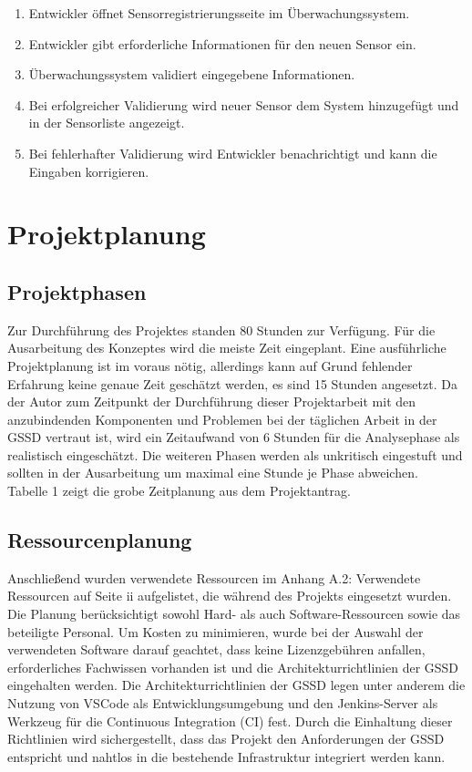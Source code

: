 \begin{flushleft}
\begin{itemize}
\begin{itemize}
		\begin{enumerate}
			\item Entwickler öffnet Sensorregistrierungsseite im Überwachungssystem.
			\item Entwickler gibt erforderliche Informationen für den neuen Sensor ein.
			\item Überwachungssystem validiert eingegebene Informationen.
			\item Bei erfolgreicher Validierung wird neuer Sensor dem System hinzugefügt und in der Sensorliste angezeigt.
			\item Bei fehlerhafter Validierung wird Entwickler benachrichtigt und kann die Eingaben korrigieren.
		\end{enumerate}
	\end{itemize}
\end{itemize}

\section{Projektplanung}

\subsection{Projektphasen}
Zur Durchführung des Projektes standen 80 Stunden zur Verfügung. Für die Ausarbeitung des Konzeptes
wird die meiste Zeit eingeplant. Eine ausführliche Projektplanung ist im voraus nötig, allerdings kann auf
Grund fehlender Erfahrung keine genaue Zeit geschätzt werden, es sind 15 Stunden angesetzt. Da der
Autor zum Zeitpunkt der Durchführung dieser Projektarbeit mit den anzubindenden Komponenten und
Problemen bei der täglichen Arbeit in der \acs{GSSD} vertraut ist, wird ein Zeitaufwand von 6 Stunden für die
Analysephase als realistisch eingeschätzt. Die weiteren Phasen werden als unkritisch eingestuft und
sollten in der Ausarbeitung um maximal eine Stunde je Phase abweichen.\\

Tabelle 1 zeigt die grobe Zeitplanung aus dem Projektantrag.


\subsection{Ressourcenplanung}
Anschließend wurden verwendete Ressourcen im Anhang A.2: Verwendete Ressourcen auf Seite ii
aufgelistet, die während des Projekts eingesetzt wurden. Die Planung berücksichtigt sowohl Hard- als auch Software-Ressourcen sowie das beteiligte Personal. Um Kosten zu minimieren, wurde bei der Auswahl der verwendeten Software darauf geachtet, dass keine Lizenzgebühren anfallen, erforderliches Fachwissen vorhanden ist und die Architekturrichtlinien der \acs{GSSD} eingehalten werden.
Die Architekturrichtlinien der \acs{GSSD} legen unter anderem die Nutzung von VSCode als Entwicklungsumgebung und den Jenkins-Server als Werkzeug für die Continuous Integration (CI) fest. Durch die Einhaltung dieser Richtlinien wird sichergestellt, dass das Projekt den Anforderungen der \acs{GSSD} entspricht und nahtlos in die bestehende Infrastruktur integriert werden kann.


\end{flushleft}
